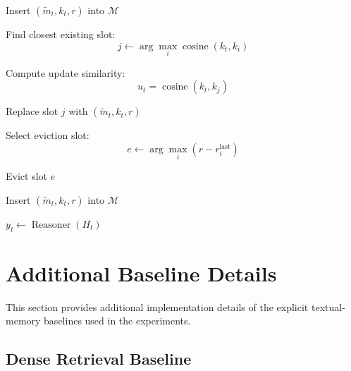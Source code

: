 \documentclass[letterpaper]{article}
\begin{document}
\begin{algorithm}[t]
\begin{algorithmic}[1]
            \STATE Insert
            \((\widetilde{m}_t,k_t,r)\)
            into \(\mathcal{M}\)


        \ELSE

            \STATE Find closest existing slot:
            \[
            j\leftarrow
            \arg\max_i
            \operatorname{cosine}(k_t,k_i)
            \]


            \STATE Compute update similarity:
            \[
            u_t=
            \operatorname{cosine}(k_t,k_j)
            \]



                \STATE Replace slot \(j\) with
                \((\widetilde{m}_t,k_t,r)\)


            \ELSE


                    \STATE Select eviction slot:
                    \[
                    e\leftarrow
                    \arg\max_i
                    (r-r_i^{\mathrm{last}})
                    \]

                    \STATE Evict slot \(e\)


                \ENDIF


                \STATE Insert
                \((\widetilde{m}_t,k_t,r)\)
                into \(\mathcal{M}\)


            \ENDIF

        \ENDIF


    \ELSE

        \STATE
        \(y_t\leftarrow\operatorname{Reasoner}(H_t)\)


    \ENDIF

\ENDFOR

\end{algorithmic}
\end{algorithm}

\section{Additional Baseline Details}
\label{sec:supp-baselines}

This section provides additional implementation details of the explicit
textual-memory baselines used in the experiments.


\subsection{Dense Retrieval Baseline}
\label{sec:supp-dense}
\end{document}
